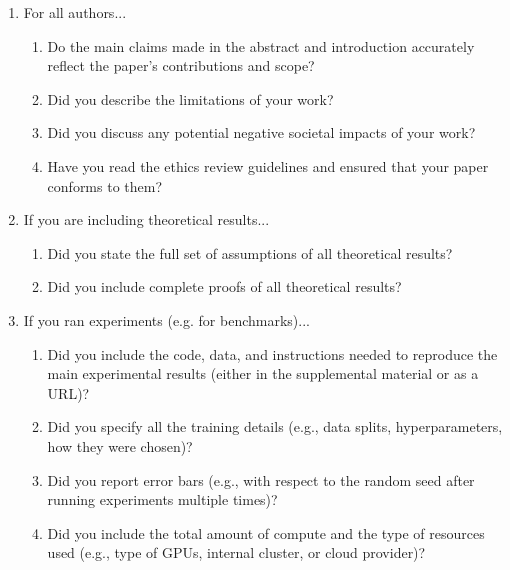 \documentclass[dvipsnames,table]{article}
\begin{document}
\begin{enumerate}

\item For all authors...
\begin{enumerate}
  \item Do the main claims made in the abstract and introduction accurately reflect the paper's contributions and scope? \answerYes{}
  
  \item Did you describe the limitations of your work? 
  \item Did you discuss any potential negative societal impacts of your work? 
  \item Have you read the ethics review guidelines and ensured that your paper conforms to them? \answerYes{}
\end{enumerate}

\item If you are including theoretical results...
\begin{enumerate}
  \item Did you state the full set of assumptions of all theoretical results?
    \answerNA{}
	\item Did you include complete proofs of all theoretical results?
    \answerNA{}
\end{enumerate}

\item If you ran experiments (e.g. for benchmarks)...
\begin{enumerate}
  \item Did you include the code, data, and instructions needed to reproduce the main experimental results (either in the supplemental material or as a URL)?
  \item Did you specify all the training details (e.g., data splits, hyperparameters, how they were chosen)?
	\item Did you report error bars (e.g., with respect to the random seed after running experiments multiple times)?
	\item Did you include the total amount of compute and the type of resources used (e.g., type of GPUs, internal cluster, or cloud provider)?
\end{enumerate}


\end{enumerate}
\end{document}
